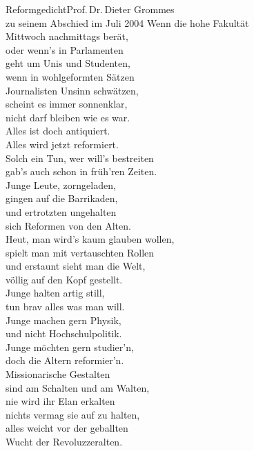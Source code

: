 
\begin{lied*}{Reformgedicht}{Prof.\,Dr.\,Dieter Grommes\\zu seinem Abschied im Juli 2004}
Wenn die hohe Fakultät\\
Mittwoch nachmittags berät,\\
oder wenn's in Parlamenten\\
geht um Unis und Studenten,\\
wenn in wohlgeformten Sätzen\\
Journalisten Unsinn schwätzen,\\
scheint es immer sonnenklar,\\
nicht darf bleiben wie es war.\\
Alles ist doch antiquiert.\\
Alles wird jetzt reformiert.\\

Solch ein Tun, wer will's bestreiten\\
gab's auch schon in früh'ren Zeiten.\\
Junge Leute, zorngeladen,\\
gingen auf die Barrikaden,\\
und ertrotzten ungehalten\\
sich Reformen von den Alten.\\

Heut, man wird's kaum glauben wollen,\\
spielt man mit vertauschten Rollen\\
und erstaunt sieht man die Welt,\\
völlig auf den Kopf gestellt.\\

Junge halten artig still,\\
tun brav alles was man will.\\
Junge machen gern Physik,\\
und nicht Hochschulpolitik.\\
Junge möchten gern studier'n,\\
doch die Altern reformier'n.\\

Missionarische Gestalten\\
sind am Schalten und am Walten,\\
nie wird ihr Elan erkalten\\
nichts vermag sie auf zu halten,\\
alles weicht vor der geballten\\
Wucht der Revoluzzeralten.\\


\end{lied*}
